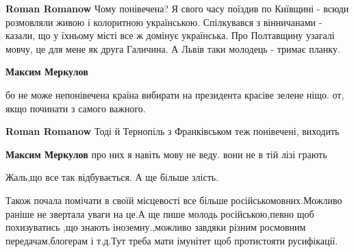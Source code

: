 \begin{itemize}
\begin{itemize}
\textbf{Roman Romanow} Чому понівечена? Я свого часу поїздив по Київщині -
всюди розмовляли живою і колоритною українською. Спілкувався з вінничанами -
казали, що у їхньому місті все ж домінує українська. Про Полтавщину узагалі
мовчу, це для мене як друга Галичина. А Львів таки молодець - тримає планку.

 
\textbf{Максим Меркулов} 

бо не може непонівечена країна вибирати на президента красіве зелене ніщо. от,
якщо починати з самого важного.


 
\textbf{Roman Romanow} Тоді й Тернопіль з Франківськом теж понівечені, виходить

 
\textbf{Максим Меркулов} про них я навіть мову не веду. вони не в тій лізі грають

\end{itemize}

 
Жаль,що все так відбувається.
А ще більше злість.

 

Також почала помічати в своїй місцевості все більше російськомовних.Можливо
раніше не звертала уваги на це.А ще пише молодь російською,певно щоб
похизуватись ,що знають іноземну.,можливо завдяки різним росмовним
передачам,блогерам і т.д.Тут треба мати імунітет щоб протистояти русифікації.



\end{itemize}
